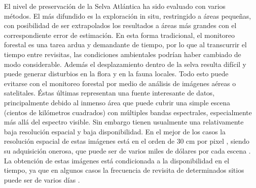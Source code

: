 El nivel de preservación de la Selva Atlántica ha sido evaluado con varios métodos. El más difundido es la exploración in situ, restringido a áreas pequeñas, con posibilidad de ser extrapolados los resultados a áreas más grandes con el correspondiente error de estimación. En esta forma tradicional, el monitoreo forestal es una tarea ardua y demandante de tiempo, por lo que al transcurrir el tiempo entre revisitas, las condiciones ambientales podrían haber cambiado de modo considerable. Además el desplazamiento dentro de la selva resulta difícil y puede generar disturbios en la flora y en la fauna locales. Todo esto puede evitarse con el monitoreo forestal por medio de análisis de imágenes aéreas o satelitales. Éstas últimas representan una fuente interesante de datos, principalmente debido al inmenso área que puede cubrir una simple escena (cientos de kilómetros cuadrados) con múltiples bandas espectrales, especialmente más allá del espectro visible. Sin embargo tienen usualmente una relativamente baja resolución espacial y baja disponibilidad. En el mejor de los casos la resolución espacial de estas imágenes está en el orden de 30 cm por pixel \cite{poli_radiometric_2014}, siendo su adquisición onerosa, que puede ser de varios miles de dólares por cada escena \cite{noauthor_geocento_2022}. La obtención de estas imágenes está condicionada a la disponibilidad en el tiempo, ya que en algunos casos la frecuencia de revisita de determinados sitios puede ser de varios días \cite{li_global_2017}.
